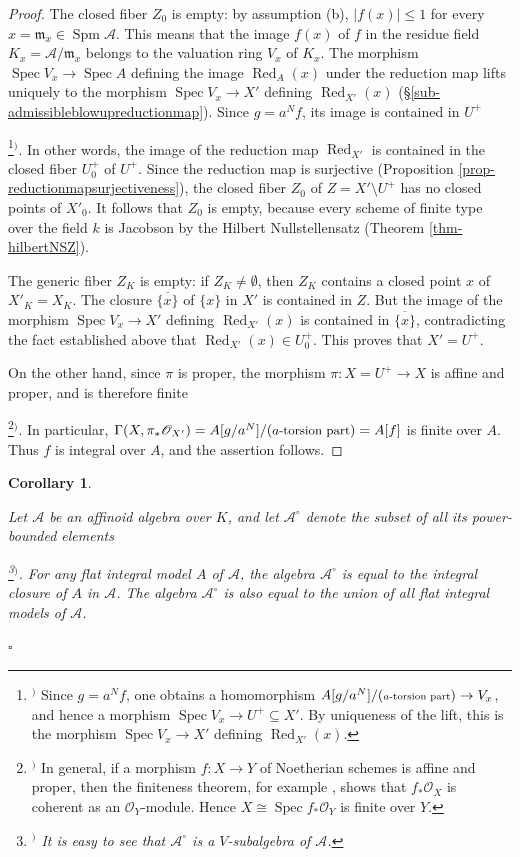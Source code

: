 \documentclass[a4paper,12pt, dvipdfmx]{jsbook}
\def\O{\mathscr{O}}
\def\m{\mathfrak{m}}
\def\ovl#1{\overline{#1}}%
\def\Red{\mathop{\mathrm{Red}}\nolimits}
\def\Spec{\mathop{\mathrm{Spec}}\nolimits}
\def\Spm{\mathop{\mathrm{Spm}}\nolimits}
\newcommand{\abs}[1]{\lvert#1\rvert}
\theoremstyle{plain}
\newtheorem{cor}[thm]{\bfseries Corollary}
\theoremstyle{definition}
\newcounter{chushaku}
\def\chu#1{\addtocounter{chushaku}{1}\footnote[\value{chushaku}]{${}^)$ #1}${}^)$}
\begin{document}
\begin{proof}[Proof]
The closed fiber $Z_0$ is empty: by assumption (b), $\abs{f(x)}\leq 1$ for every $x=\m_x\in\Spm\mathcal{A}$. This means that the image $f(x)$ of $f$ in the residue field $K_x=\mathcal{A}/\m_x$ belongs to the valuation ring $V_x$ of $K_x$.
The morphism $\Spec V_x\rightarrow\Spec A$ defining the image $\Red_A(x)$ under the reduction map lifts uniquely to the morphism $\Spec V_x\rightarrow X'$ defining $\Red_{X'}(x)$ (\S\ref{sub-admissibleblowupreductionmap}). Since $g=a^Nf$, its image is contained in $U^+$\chu{Since $g=a^Nf$, one obtains a homomorphism $A[{\textstyle g/a^N}]/(\textrm{{\scriptsize $a$-torsion part}})\rightarrow V_x$, and hence a morphism $\Spec V_x\rightarrow U^+\subseteq X'$. By uniqueness of the lift, this is the morphism $\Spec V_x\rightarrow X'$ defining $\Red_{X'}(x)$.}.
In other words, the image of the reduction map $\Red_{X'}$ is contained in the closed fiber $U^+_0$ of $U^+$.
Since the reduction map is surjective (Proposition \ref{prop-reductionmapsurjectiveness}), the closed fiber $Z_0$ of $Z=X'\setminus U^+$ has no closed points of $X'_0$.
It follows that $Z_0$ is empty, because every scheme of finite type over the field $k$ is Jacobson by the Hilbert Nullstellensatz (Theorem \ref{thm-hilbertNSZ}).

The generic fiber $Z_K$ is empty: if $Z_K\neq\emptyset$, then $Z_K$ contains a closed point $x$ of $X'_K=X_K$.
The closure $\ovl{\{x\}}$ of $\{x\}$ in $X'$ is contained in $Z$.
But the image of the morphism $\Spec V_x\rightarrow X'$ defining $\Red_{X'}(x)$ is contained in $\ovl{\{x\}}$, contradicting the fact established above that $\Red_{X'}(x)\in U^+_0$.
This proves that $X'=U^+$.

On the other hand, since $\pi$ is proper, the morphism $\pi\colon X=U^+\rightarrow X$ is affine and proper, and is therefore finite\chu{In general, if a morphism $f\colon X\rightarrow Y$ of Noetherian schemes is affine and proper, then the finiteness theorem, for example \cite[Chap.\ III, Theorem 8.8 (b)]{Hart2}, shows that $f_{\ast}\O_X$ is coherent as an $\O_Y$-module. Hence $X\cong\Spec f_{\ast}\O_Y$ is finite over $Y$.}.
In particular, $\Gamma(X,\pi_{\ast}\O_{X'})=A[{\textstyle g/a^N}]/(\textrm{{\small $a$-torsion part}})=A[f]$ is finite over $A$.
Thus $f$ is integral over $A$, and the assertion follows.
\end{proof}

\begin{cor}\label{cor-powerboundeddetermine2}{\rm 
Let $\mathcal{A}$ be an affinoid algebra over $K$, and let $\mathcal{A}^{\circ}$ denote the subset of all its power-bounded elements\chu{It is easy to see that $\mathcal{A}^{\circ}$ is a $V$-subalgebra of $\mathcal{A}$.}.
For any flat integral model $A$ of $\mathcal{A}$, the algebra $\mathcal{A}^{\circ}$ is equal to the integral closure of $A$ in $\mathcal{A}$. The algebra $\mathcal{A}^{\circ}$ is also equal to the union of all flat integral models of $\mathcal{A}$.}\hfill$\square$
\end{cor}
\end{document}
